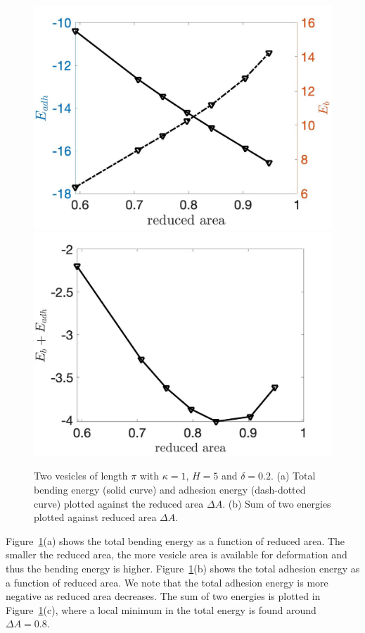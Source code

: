 \documentclass[prf,superscriptaddress,showpacs]{revtex4-1}
\begin{document}
\begin{figure}
\includegraphics[keepaspectratio=true,scale=0.175]{figs/Dec18_Ebleft_Eadhright_vs_rA_adR0p2_adS502.jpeg}
\includegraphics[keepaspectratio=true,scale=0.175]{figs/Dec18_EbEadh_vs_rA_adR0p2_adS502.jpeg}
\caption{Two vesicles of length $\pi$ with $\kappa=1$, $H=5$ and $\delta=0.2$. 
(a) Total bending energy (solid curve) and adhesion energy (dash-dotted curve) plotted against
the reduced area $\Delta A$. (b) Sum of two energies plotted against reduced area $\Delta A$.}
\label{fig:Dec18_vesicle_equilibrium1}
\end{figure}
Figure~\ref{fig:Dec18_vesicle_equilibrium1}(a) shows the total bending
energy as a function of reduced area. The smaller the reduced area, the
more vesicle area is available for deformation and thus the bending
energy is higher. Figure~\ref{fig:Dec18_vesicle_equilibrium1}(b) shows
the total adhesion energy as a function of reduced area. We note that
the total adhesion energy is more negative as reduced area decreases.
The sum of two energies is plotted in
Figure~\ref{fig:Dec18_vesicle_equilibrium1}(c), where a local minimum in
the total energy is found around $\Delta A =0.8$.
\end{document}
